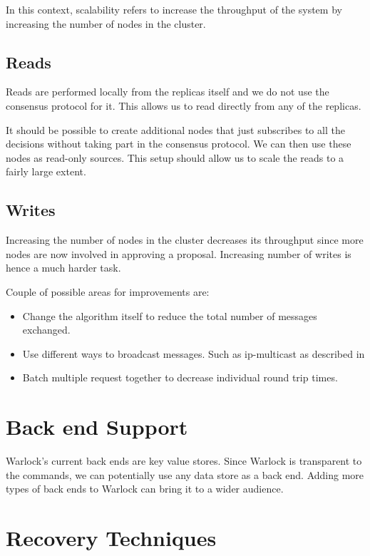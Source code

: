 In this context, scalability refers to increase the throughput of the system
by increasing the number of nodes in the cluster.

\subsection{Reads}

Reads are performed locally from the replicas itself and we do not use the
consensus protocol for it. This allows us to read directly from any of the
replicas.

It should be possible to create additional nodes that just subscribes to all
the decisions without taking part in the consensus protocol. We can then use
these nodes as read-only sources. This setup should allow us to scale the reads
to a fairly large extent.

\subsection{Writes}

Increasing the number of nodes in the cluster decreases its throughput since
more nodes are now involved in approving a proposal. Increasing number of writes
is hence a much harder task.

Couple of possible areas for improvements are:

\begin{itemize}
  \item Change the algorithm itself to reduce the total number of messages
    exchanged.
  \item Use different ways to broadcast messages. Such as ip-multicast as
    described in \citet{MarandiPSP10}
  \item Batch multiple request together to decrease individual round trip times.
\end{itemize}

\section{Back end Support}

Warlock's current back ends are key value stores. Since Warlock is transparent
to the commands, we can potentially use any data store as a back end. Adding
more types of back ends to Warlock can bring it to a wider audience.

\section{Recovery Techniques}

